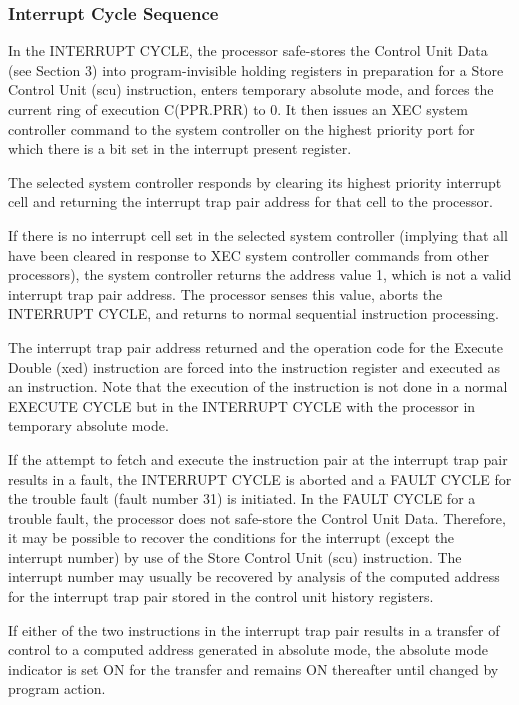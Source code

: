 \subsubsection{Interrupt Cycle Sequence}

In the INTERRUPT CYCLE, the processor safe-stores the Control Unit Data (see
Section 3) into program-invisible holding registers in preparation for a Store
Control Unit (scu) instruction, enters temporary absolute mode, and forces the
current ring of execution C(PPR.PRR) to 0. It then issues an XEC system
controller command to the system controller on the highest priority port for
which there is a bit set in the interrupt present register.


The selected system controller responds by clearing its highest priority
interrupt cell and returning the interrupt trap pair address for that cell to
the processor.

If there is no interrupt cell set in the selected system controller (implying
that all have been cleared in response to XEC system controller commands from
other processors), the system controller returns the address value 1, which is
not a valid interrupt trap pair address. The processor senses this value,
aborts the INTERRUPT CYCLE, and returns to normal sequential instruction
processing.


The interrupt trap pair address returned and the operation code for the Execute
Double (xed) instruction are forced into the instruction register and executed
as an instruction. Note that the execution of the instruction is not done in a
normal EXECUTE CYCLE but in the INTERRUPT CYCLE with the processor in temporary
absolute mode.


If the attempt to fetch and execute the instruction pair at the interrupt trap
pair results in a fault, the INTERRUPT CYCLE is aborted and a FAULT CYCLE for
the trouble fault (fault number 31) is initiated. In the FAULT CYCLE for a
trouble fault, the processor does not safe-store the Control Unit Data.
Therefore, it may be possible to recover the conditions for the interrupt
(except the interrupt number) by use of the Store Control Unit (scu)
instruction. The interrupt number may usually be recovered by analysis of the
computed address for the interrupt trap pair stored in the control unit history
registers.


If either of the two instructions in the interrupt trap pair results in a
transfer of control to a computed address generated in absolute mode, the
absolute mode indicator is set ON for the transfer and remains ON thereafter
until changed by program action.


